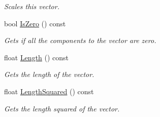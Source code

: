 \begin{DoxyCompactItemize}
\begin{DoxyCompactList}\small\item\em Scales this vector. \end{DoxyCompactList}\item 
bool \hyperlink{class_flounder_1_1_vector2_a557ef9eafbbee0a45f785e70b2568f7b}{Is\+Zero} () const
\begin{DoxyCompactList}\small\item\em Gets if all the components to the vector are zero. \end{DoxyCompactList}\item 
float \hyperlink{class_flounder_1_1_vector2_a650930a0b411de5d36e9a11b0488a3e3}{Length} () const
\begin{DoxyCompactList}\small\item\em Gets the length of the vector. \end{DoxyCompactList}\item 
float \hyperlink{class_flounder_1_1_vector2_aa49723db7c24d370125838035cc15507}{Length\+Squared} () const
\begin{DoxyCompactList}\small\item\em Gets the length squared of the vector. \end{DoxyCompactList}\end{DoxyCompactItemize}
